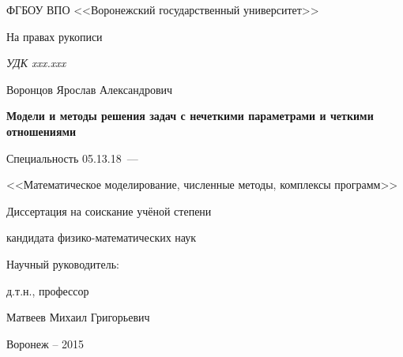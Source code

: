 \thispagestyle{empty}

\begin{center}
ФГБОУ ВПО <<Воронежский государственный университет>>\par
\par 
\par
\end{center}

\vspace{10mm}
\begin{flushright}
На правах рукописи

{\sl УДК xxx.xxx}
\end{flushright}

\vspace{15mm}
\begin{center}
{\large Воронцов Ярослав Александрович}
\end{center}

\vspace{5mm}
\begin{center}
{\bf \large Модели и методы решения задач с нечеткими параметрами и четкими отношениями
\par}

\vspace{10mm}
{%
Специальность 05.13.18~---

<<Математическое моделирование, численные методы, комплексы программ>>
}

\vspace{10mm}
Диссертация на соискание учёной степени

кандидата физико-математических наук
\end{center}

\vspace{20mm}
\begin{flushright}
Научный руководитель:

д.т.н., профессор

Матвеев Михаил Григорьевич

\end{flushright}

\vspace{20mm}
\begin{center}
{Воронеж -- 2015}
\end{center}

\newpage